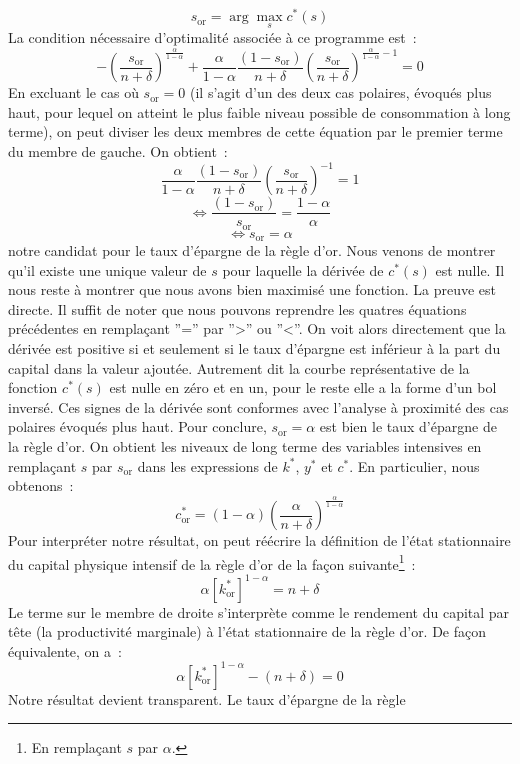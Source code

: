 \documentclass[10pt,a4paper,notitlepage,onecolumn]{article}
\begin{document}
\[
s_{\mathrm{or}} = \arg\max_{s} c^{\ast}(s)
\]
La condition nécessaire d'optimalité associée à ce programme est~:
\[
-\left(\frac{s_{\mathrm{or}}}{n+\delta}\right)^{\frac{\alpha}{1-\alpha}}+
\frac{\alpha}{1-\alpha}\frac{(1-s_{\mathrm{or}})}{n+\delta}\left(\frac{s_{\mathrm{or}}}{n+\delta}\right)^{\frac{\alpha}{1-\alpha}-1}
= 0
\]
En excluant le cas où $s_{\mathrm{or}}=0$ (il s'agit d'un des deux
cas polaires, évoqués plus haut, pour lequel on atteint le plus
faible niveau possible de consommation à long terme), on peut
diviser les deux membres de cette équation par le premier terme du
membre de gauche. On obtient~:
\[
\frac{\alpha}{1-\alpha}\frac{(1-s_{\mathrm{or}})}{n+\delta}\left(\frac{s_{\mathrm{or}}}{n+\delta}\right)^{-1}
= 1
\]
\[
\Leftrightarrow\frac{(1-s_{\mathrm{or}})}{s_{\mathrm{or}}}
 = \frac{1-\alpha}{\alpha}
\]
\[
\Leftrightarrow s_{\mathrm{or}}=\alpha
\]
notre candidat pour le taux d'épargne de la règle d'or. Nous venons
de montrer qu'il existe une unique valeur de $s$ pour laquelle la
dérivée de $c^{\ast}(s)$ est nulle. Il nous reste à montrer que nous
avons bien maximisé une fonction. La preuve est directe. Il suffit
de noter que nous pouvons reprendre les quatres équations
précédentes en remplaçant ''='' par ''>'' ou ''<''. On voit alors
directement que la dérivée est positive si et seulement si le taux
d'épargne est inférieur à la part du capital dans la valeur ajoutée.
Autrement dit la courbe représentative de la fonction $c^{\ast}(s)$
est nulle en zéro et en un, pour le reste elle a la forme d'un bol
inversé. Ces signes de la dérivée sont conformes avec l'analyse à
proximité des cas polaires évoqués plus haut. Pour conclure,
$s_{\mathrm{or}}=\alpha$ est bien le taux d'épargne de la règle
d'or. On obtient les niveaux de long terme des variables intensives
en remplaçant $s$ par $s_{\mathrm{or}}$ dans les expressions de
$k^{\ast}$, $y^{\ast}$ et $c^{\ast}$. En particulier, nous
obtenons~:
\[
c^{\ast}_{\mathrm{or}} =
(1-\alpha)\left(\frac{\alpha}{n+\delta}\right)^{\frac{\alpha}{1-\alpha}}
\]
Pour interpréter notre résultat, on peut réécrire la définition de
l'état stationnaire du capital physique intensif de la règle d'or de
la façon suivante\footnote{En remplaçant $s$ par $\alpha$.}~:
\[
\alpha \left[k^{\ast}_{\mathrm{or}}\right]^{1-\alpha} = n+\delta
\]
Le terme sur le membre de droite s'interprète comme le rendement du
capital par tête (la productivité marginale) à l'état stationnaire
de la règle d'or. De façon équivalente, on a~:
\[
\alpha \left[k^{\ast}_{\mathrm{or}}\right]^{1-\alpha} - (n+\delta) =
0
\]
Notre résultat devient transparent. Le taux d'épargne de la règle
\end{document}
